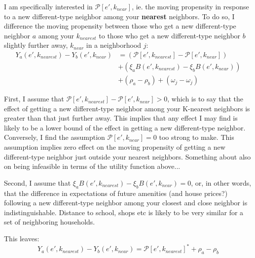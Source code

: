 \documentclass[../main.tex]{subfiles}
\begin{document}
I am specifically interested in $\mathcal{P}[e', k_{near}]$, ie. the moving propensity in response to a new different-type neighbor among your \textbf{nearest} neighbors. To do so, I difference the moving propensity between those who get a new different-type neighbor $a$ among your $k_{nearest}$ to those who get a new different-type neighbor $b$ slightly further away, $k_{near}$ in a neighborhood $j$:
\begin{equation}
\begin{split}
    Y_a(e', k_{nearest}) - Y_b(e', k_{near}) &=( \mathcal{P}[e', k_{nearest}] - \mathcal{P}[e', k_{near}]) \\
    &+ (\xi_a B(e', k_{nearest}) - \xi_b B(e', k_{near})) \\
    &+ (\rho_a - \rho_b)  + (\omega_j - \omega_j)
\end{split}
\label{eq:move_propensity_diff}
\end{equation}


First, I assume that $\mathcal{P}[e', k_{nearest}] - \mathcal{P}[e', k_{near}] > 0$, which is to say that the effect of getting a new different-type neighbor among your K-nearest neighbors is greater than that just further away. This implies that any effect I may find is likely to be a lower bound of the effect in getting a new different-type neighbor. Conversely, I find the assumption $\mathcal{P}[e', k_{near}] = 0$ too strong to make. This assumption implies zero effect on the moving propensity of getting a new different-type neighbor just outside your nearest neighbors. Something about also on being infeasible in terms of the utility function above...

Second, I assume that $\xi_a B(e', k_{nearest}) - \xi_b B(e', k_{near})=0$, or, in other words, that the difference in expectations of future amenities (and house prices?) following a new different-type neighbor among your closest and close neighbor is indistinguishable. Distance to school, shops etc is likely to be very similar for a set of neighboring households. 

This leaves:
\begin{equation}
    Y_a(e', k_{nearest}) - Y_b(e', k_{near}) = \mathcal{P}[e', k_{nearest}]^* + \rho_a - \rho_b
\end{equation}
\end{document}
